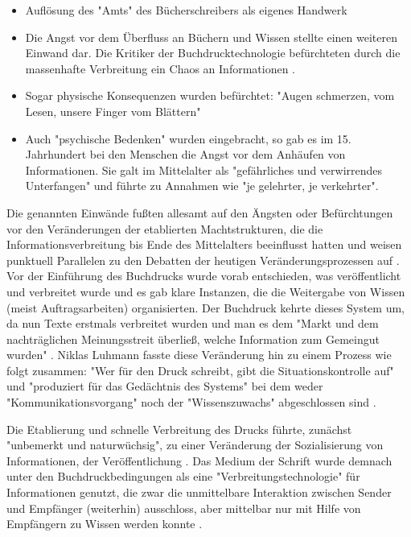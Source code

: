 \begin{itemize}
\item Auflösung des "Amts" des Bücherschreibers als eigenes Handwerk
\item Die Angst vor dem Überfluss an Büchern und Wissen stellte einen weiteren Einwand dar. Die Kritiker der Buchdrucktechnologie befürchteten  durch die massenhafte Verbreitung ein Chaos an Informationen \cite{giesecke_1991_buchdruck}.
\item Sogar physische Konsequenzen wurden befürchtet: "Augen schmerzen, vom Lesen, unsere Finger vom Blättern" \cite{giesecke_1991_buchdruck}
\item Auch "psychische Bedenken" wurden eingebracht, so gab es im 15. Jahrhundert bei den Menschen die Angst vor dem Anhäufen von Informationen. Sie galt im Mittelalter als "gefährliches und verwirrendes Unterfangen" und führte zu Annahmen wie "je gelehrter, je verkehrter". \cite{giesecke_1991_buchdruck}
\end{itemize}

Die genannten Einwände fußten allesamt auf den Ängsten oder Befürchtungen vor den Veränderungen der etablierten Machtstrukturen, die die Informationsverbreitung bis Ende des Mittelalters beeinflusst hatten und weisen punktuell Parallelen zu den Debatten der heutigen Veränderungsprozessen auf \cite{hagner_2015_sache_buches}. Vor der Einführung des Buchdrucks wurde vorab entschieden, was veröffentlicht und verbreitet wurde und es gab klare Instanzen, die die Weitergabe von Wissen (meist Auftragsarbeiten) organisierten. Der Buchdruck kehrte dieses System um, da nun Texte erstmals verbreitet wurden und man es dem "Markt und dem nachträglichen Meinungsstreit überließ, welche Information zum Gemeingut wurden" \cite{giesecke_1991_buchdruck}. Niklas Luhmann fasste diese Veränderung hin zu einem Prozess wie folgt zusammen: "Wer für den Druck schreibt, gibt die Situationskontrolle auf" und "produziert für das Gedächtnis des Systems" bei dem weder "Kommunikationsvorgang" noch der "Wissenszuwachs" abgeschlossen sind \cite{Luhmann1998}.

Die Etablierung und schnelle Verbreitung \cite{stober_2014_pressegeschichte} des Drucks führte, zunächst "unbemerkt und naturwüchsig", zu einer Veränderung der Sozialisierung von Informationen, der Veröffentlichung \cite{giesecke_1991_buchdruck}. Das Medium der Schrift wurde demnach unter den Buchdruckbedingungen als eine "Verbreitungstechnologie" für Informationen genutzt, die zwar die unmittelbare Interaktion zwischen Sender und Empfänger (weiterhin) ausschloss, aber mittelbar nur mit Hilfe von Empfängern zu Wissen werden konnte \cite{Luhmann1998}.

